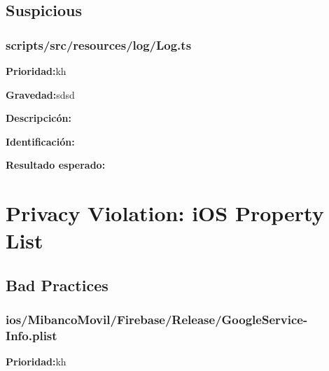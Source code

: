 \documentclass{article}
\begin{document}
    \subsection{Suspicious}
        \subsubsection{scripts/src/resources/log/Log.ts}
        \begingroup
        \noindent
        \leftskip 35pt 
        \rightskip 0pt 
        \vspace{10pt}
        \textbf{Prioridad:}kh

        \endgroup

        \begingroup
        \noindent
        \leftskip 35pt 
        \rightskip 0pt 
        \vspace{10pt}
        \textbf{Gravedad:}sdsd

        \endgroup
            
        \begingroup
        \noindent
        \leftskip 35pt 
        \rightskip 0pt 
        \vspace{10pt}
        \textbf{Descripcicón:}
    
        \endgroup

        \begingroup
        \noindent
        \leftskip 35pt 
        \rightskip 0pt 
        \vspace{10pt}
        \textbf{Identificación:}
        
        \endgroup

        \begingroup
        \noindent
        \leftskip 35pt 
        \rightskip 0pt 
        \vspace{10pt}
        \textbf{Resultado esperado:}
    
        \endgroup
   

\section{Privacy Violation: iOS Property List}
    \subsection{Bad Practices}
        \subsubsection{ios/MibancoMovil/Firebase/Release/GoogleService-Info.plist}
        \begingroup
        \noindent
        \leftskip 35pt 
        \rightskip 0pt 
        \vspace{10pt}
        \textbf{Prioridad:}kh
\end{document}
